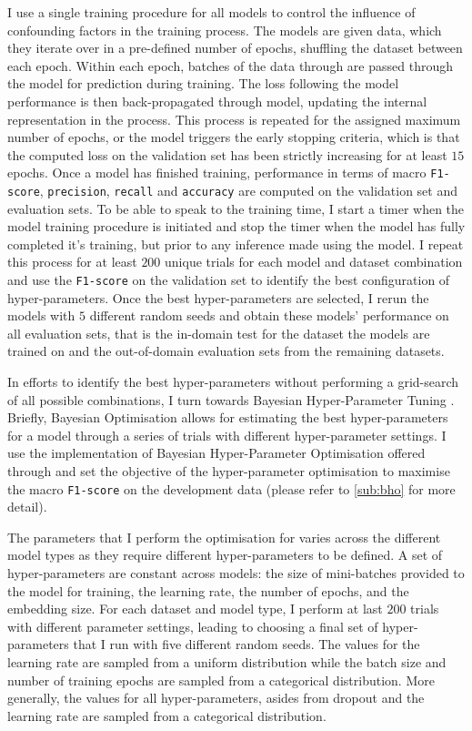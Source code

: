 I use a single training procedure for all models to control the influence of confounding factors in the training process.
The models are given data, which they iterate over in a pre-defined number of epochs, shuffling the dataset between each epoch. Within each epoch, batches of the data through are passed through the model for prediction during training.
The loss following the model performance is then back-propagated through model, updating the internal representation in the process.
This process is repeated for the assigned maximum number of epochs, or the model triggers the early stopping \citep{Prechelt:1998} criteria, which is that the computed loss on the validation set has been strictly increasing for at least $15$ epochs.
Once a model has finished training, performance in terms of macro \texttt{F1-score}, \texttt{precision}, \texttt{recall} and \texttt{accuracy} are computed on the validation set and evaluation sets.
To be able to speak to the training time, I start a timer when the model training procedure is initiated and stop the timer when the model has fully completed it's training, but prior to any inference made using the model.
I repeat this process for at least $200$ unique trials for each model and dataset combination and use the \texttt{F1-score} on the validation set to identify the best configuration of hyper-parameters.
Once the best hyper-parameters are selected, I rerun the models with $5$ different random seeds and obtain these models' performance on all evaluation sets, that is the in-domain test for the dataset the models are trained on and the out-of-domain evaluation sets from the remaining datasets.

In efforts to identify the best hyper-parameters without performing a grid-search of all possible combinations, I turn towards Bayesian Hyper-Parameter Tuning \citep{Neal:1996}. Briefly, Bayesian Optimisation allows for estimating the best hyper-parameters for a model through a series of trials with different hyper-parameter settings. I use the implementation of Bayesian Hyper-Parameter Optimisation offered through \citet{Wandb} and set the objective of the hyper-parameter optimisation to maximise the macro \texttt{F1-score} on the development data (please refer to \cref{sub:bho} for more detail).

The parameters that I perform the optimisation for varies across the different model types as they require different hyper-parameters to be defined. A set of hyper-parameters are constant across models: the size of mini-batches provided to the model for training, the learning rate, the number of epochs, and the embedding size. For each dataset and model type, I perform at last $200$ trials with different parameter settings, leading to choosing a final set of hyper-parameters that I run with five different random seeds.
The values for the learning rate are sampled from a uniform distribution while the batch size and number of training epochs are sampled from a categorical distribution. More generally, the values for all hyper-parameters, asides from dropout and the learning rate are sampled from a categorical distribution.

